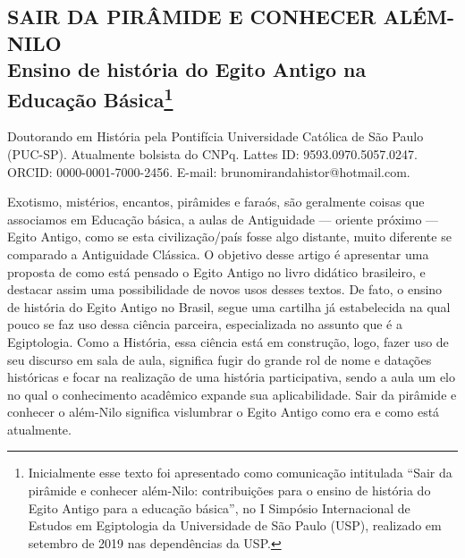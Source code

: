 \begin{refsection}
    \renewcommand{\thefigure}{\arabic{figure}}

    \chapter[Sair da pirâmide e conhecer Além-Nilo: {\itshape ensino de história do Egito Antigo na Educação Básica}]{SAIR DA PIRÂMIDE E CONHECER ALÉM-NILO\\Ensino de história do Egito Antigo na Educação Básica\footnote{Inicialmente esse texto foi apresentado como comunicação intitulada ``Sair da pirâmide e conhecer além-Nilo: contribuições para o ensino de história do Egito Antigo para a educação básica'', no I Simpósio Internacional de Estudos em Egiptologia da Universidade de São Paulo (USP), realizado em setembro de 2019 nas dependências da USP.}}
    \label{chap:sairpiramide}
    
    {Doutorando em História pela Pontifícia Universidade Católica de São Paulo
    (PUC-SP). Atualmente bolsista do CNPq. Lattes ID: 9593.0970.5057.0247.
    ORCID: 0000-0001-7000-2456. E-mail: brunomirandahistor@hotmail.com.}

    \begin{galoResumo}
         Exotismo, mistérios, encantos, pirâmides e faraós, são geralmente coisas que associamos em Educação básica, a aulas de Antiguidade --- oriente próximo --- Egito Antigo, como se esta civilização/país fosse algo distante, muito diferente se comparado a Antiguidade Clássica. O objetivo desse artigo é apresentar uma proposta de como está pensado o Egito Antigo no livro didático brasileiro, e destacar assim uma possibilidade de novos usos desses textos. De fato, o ensino de história do Egito Antigo no Brasil, segue uma cartilha já estabelecida na qual pouco se faz uso dessa ciência parceira, especializada no assunto que é a Egiptologia. Como a História, essa ciência está em construção, logo, fazer uso de seu discurso em sala de aula, significa fugir do grande rol de nome e datações históricas e focar na realização de uma história participativa, sendo a aula um elo no qual o conhecimento acadêmico expande sua aplicabilidade. Sair da pirâmide e conhecer o além-Nilo significa vislumbrar o Egito Antigo como era e como está atualmente.
    \end{galoResumo}
    

\end{refsection}
